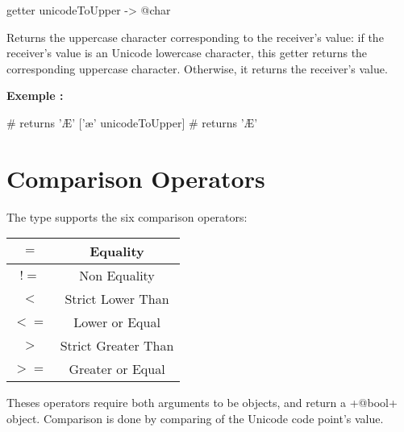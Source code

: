 \begin{galgascode}
getter unicodeToUpper -> @char
\end{galgascode}

Returns the uppercase character corresponding to the receiver's value: if the receiver's value is an Unicode lowercase character, this getter returns the corresponding uppercase character. Otherwise, it returns the receiver's value.

\textbf{Exemple :}
\begin{galgascode}
['Æ' unicodeToUpper] # returns 'Æ'
['æ' unicodeToUpper] # returns 'Æ'
\end{galgascode}





\section{Comparison Operators}

The  type supports the six comparison operators:\newline

\begin{tabular}{|c|c|}
\hline
$=$ & Equality \\
\hline
$!=$ & Non Equality \\
\hline
$<$  & Strict Lower Than \\
\hline
$<=$  & Lower or Equal \\
\hline
$>$  & Strict Greater Than \\
\hline
$>=$  & Greater or Equal \\
\hline
\end{tabular}

Theses operators require both arguments to be  objects, and return a \ggs+@bool+ object. Comparison is done by comparing of the Unicode code point's value.



